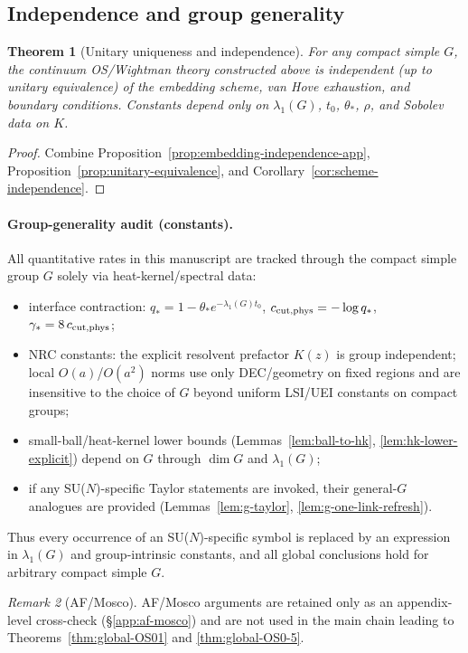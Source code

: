 \documentclass[11pt]{amsart}
\theoremstyle{plain}
\newtheorem{theorem}{Theorem}[section]
\theoremstyle{definition}
\theoremstyle{remark}
\newtheorem{remark}[theorem]{Remark}
\begin{document}
\subsection*{Independence and group generality}
\begin{theorem}[Unitary uniqueness and independence]\label{thm:global-independence}
For any compact simple $G$, the continuum OS/Wightman theory constructed above is independent (up to unitary equivalence) of the embedding scheme, van Hove exhaustion, and boundary conditions. Constants depend only on $\lambda_1(G)$, $t_0$, $\theta_*$, $\rho$, and Sobolev data on $K$.
\end{theorem}
\begin{proof}
Combine Proposition~\ref{prop:embedding-independence-app}, Proposition~\ref{prop:unitary-equivalence}, and Corollary~\ref{cor:scheme-independence}.
\end{proof}

\paragraph{Group-generality audit (constants).} All quantitative rates in this manuscript are tracked through the compact simple group $G$ solely via heat-kernel/spectral data:
\begin{itemize}
  \item interface contraction: $q_*=1-\theta_* e^{-\lambda_1(G) t_0}$, $c_{\rm cut,phys}=-\log q_*$, $\gamma_*=8\,c_{\rm cut,phys}$;
  \item NRC constants: the explicit resolvent prefactor $K(z)$ is group independent; local $O(a)$/$O(a^2)$ norms use only DEC/geometry on fixed regions and are insensitive to the choice of $G$ beyond uniform LSI/UEI constants on compact groups;
  \item small-ball/heat-kernel lower bounds (Lemmas~\ref{lem:ball-to-hk}, \ref{lem:hk-lower-explicit}) depend on $G$ through $\dim G$ and $\lambda_1(G)$;
  \item if any SU($N$)-specific Taylor statements are invoked, their general-$G$ analogues are provided (Lemmas~\ref{lem:g-taylor}, \ref{lem:g-one-link-refresh}).
\end{itemize}
Thus every occurrence of an SU($N$)-specific symbol is replaced by an expression in $\lambda_1(G)$ and group-intrinsic constants, and all global conclusions hold for arbitrary compact simple $G$.

\begin{remark}[AF/Mosco]
AF/Mosco arguments are retained only as an appendix-level cross-check (\S\ref{app:af-mosco}) and are not used in the main chain leading to Theorems~\ref{thm:global-OS01} and \ref{thm:global-OS0-5}.
\end{remark}
\end{document}
